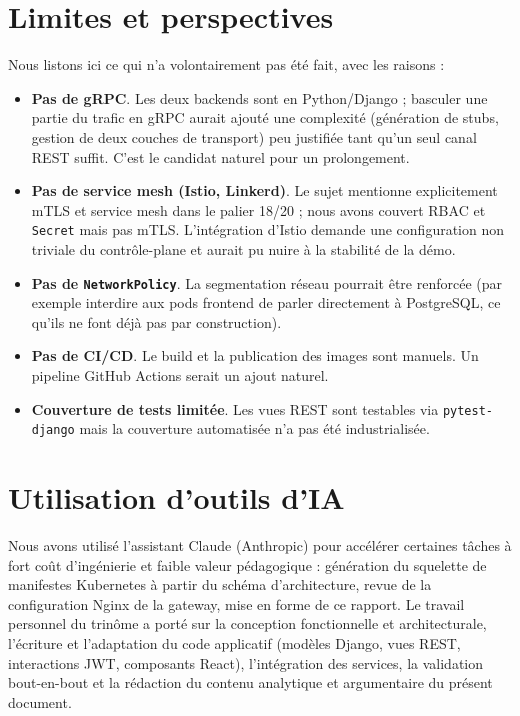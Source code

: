 \documentclass[11pt,a4paper]{article}
\newcommand{\code}[1]{\texttt{#1}}
\begin{document}
\section{Limites et perspectives}

Nous listons ici ce qui n'a volontairement pas été fait, avec les raisons :

\begin{itemize}
    \item \textbf{Pas de gRPC}. Les deux backends sont en Python/Django ; basculer une partie du trafic en gRPC aurait ajouté une complexité (génération de stubs, gestion de deux couches de transport) peu justifiée tant qu'un seul canal REST suffit. C'est le candidat naturel pour un prolongement.
    \item \textbf{Pas de service mesh (Istio, Linkerd)}. Le sujet mentionne explicitement mTLS et service mesh dans le palier 18/20 ; nous avons couvert RBAC et \code{Secret} mais pas mTLS. L'intégration d'Istio demande une configuration non triviale du contrôle-plane et aurait pu nuire à la stabilité de la démo.
    \item \textbf{Pas de \code{NetworkPolicy}}. La segmentation réseau pourrait être renforcée (par exemple interdire aux pods frontend de parler directement à PostgreSQL, ce qu'ils ne font déjà pas par construction).
    \item \textbf{Pas de CI/CD}. Le build et la publication des images sont manuels. Un pipeline GitHub Actions serait un ajout naturel.
    \item \textbf{Couverture de tests limitée}. Les vues REST sont testables via \code{pytest-django} mais la couverture automatisée n'a pas été industrialisée.
\end{itemize}

\section{Utilisation d'outils d'IA}

Nous avons utilisé l'assistant Claude (Anthropic) pour accélérer certaines tâches à fort coût d'ingénierie et faible valeur pédagogique : génération du squelette de manifestes Kubernetes à partir du schéma d'architecture, revue de la configuration Nginx de la gateway, mise en forme de ce rapport. Le travail personnel du trinôme a porté sur la conception fonctionnelle et architecturale, l'écriture et l'adaptation du code applicatif (modèles Django, vues REST, interactions JWT, composants React), l'intégration des services, la validation bout-en-bout et la rédaction du contenu analytique et argumentaire du présent document.
\end{document}
